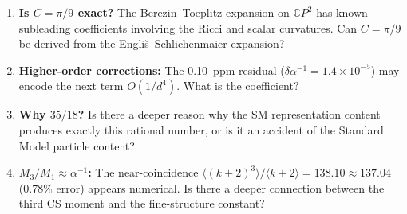 \documentclass[12pt,a4paper]{article}
\theoremstyle{definition}
\theoremstyle{remark}
\begin{document}
\begin{enumerate}
\item \textbf{Is $C = \pi/9$ exact?}  The Berezin--Toeplitz expansion
  on $\mathbb{C}P^2$ has known subleading coefficients involving
  the Ricci and scalar curvatures.  Can $C = \pi/9$ be derived from
  the Engli\v{s}--Schlichenmaier expansion?

\item \textbf{Higher-order corrections:}  The 0.10~ppm residual
  ($\delta\alpha^{-1} = 1.4 \times 10^{-5}$) may encode the next
  term $O(1/d^4)$.  What is the coefficient?

\item \textbf{Why $35/18$?}  Is there a deeper reason why the SM
  representation content produces exactly this rational number, or is
  it an accident of the Standard Model particle content?

\item \textbf{$M_3/M_1 \approx \alpha^{-1}$:}  The near-coincidence
  $\langle (k+2)^3 \rangle / \langle k+2 \rangle = 138.10 \approx 137.04$
  (0.78\% error) appears numerical.  Is there a deeper connection between
  the third CS moment and the fine-structure constant?
\end{enumerate}
\end{document}
